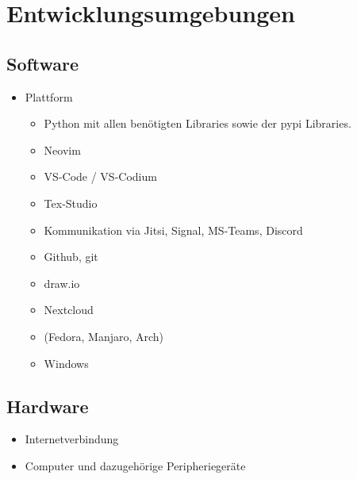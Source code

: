 \chapter{Entwicklungsumgebungen}

\section{Software}

\begin{itemize}
	\item Plattform
		\begin{itemize}
			\item Python mit allen benötigten Libraries sowie der pypi Libraries.
		\end{itemize}

		\begin{itemize}
			\item Neovim
			\item VS-Code / VS-Codium
			\item Tex-Studio
			\item Kommunikation via Jitsi, Signal, MS-Teams, Discord
			\item Github, git
			\item draw.io
			\item Nextcloud
			\item \Linux (Fedora, Manjaro, Arch) 
			\item Windows
		\end{itemize}
\end{itemize}

\section{Hardware}

\begin{itemize}
	\item Internetverbindung
	\item Computer und dazugehörige Peripheriegeräte
\end{itemize}
